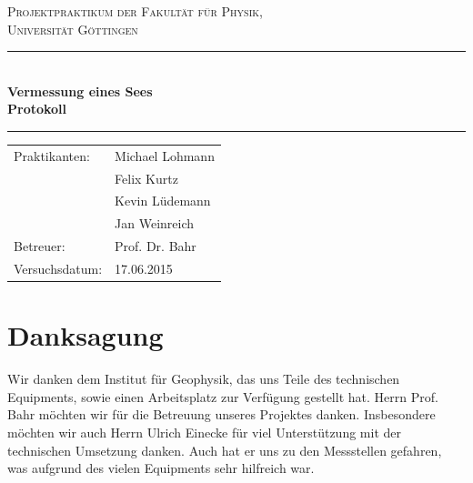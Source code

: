 \documentclass[12pt,a4paper,titlepage,headinclude,bibtotoc]{scrartcl}
\numberwithin{equation}{subsection}
\newenvironment{bottom}{\par\vspace*{\fill}}{\clearpage}
\begin{document}
\begin{titlepage}
\centering
\textsc{\Large Projektpraktikum der Fakultät für
  Physik,\\[1ex] Universität Göttingen}

\vspace*{2cm}

\rule{\textwidth}{1pt}\\[0.5cm]
{\huge \bfseries
  Vermessung eines Sees \\[1ex]
  Protokoll}\\[0.5cm]
\rule{\textwidth}{1pt}

\vspace*{2cm}

\begin{Large}
\begin{tabular}{ll}
Praktikanten: &  Michael Lohmann\\
 &  Felix Kurtz\\
 &  Kevin Lüdemann\\
 &  Jan Weinreich\\
 Betreuer: & Prof. Dr. Bahr\\
 Versuchsdatum: & 17.06.2015\\
\end{tabular}
\end{Large}

\vspace*{3.8cm}

\begin{Large}
\end{Large}

\end{titlepage}
\thispagestyle{empty}
\tableofcontents
\thispagestyle{empty}
\begin{bottom}
\section*{Danksagung}
Wir danken dem Institut für Geophysik, das uns Teile des technischen Equipments, sowie einen Arbeitsplatz zur Verfügung gestellt hat.
Herrn Prof. Bahr möchten wir für die Betreuung unseres Projektes danken.
Insbesondere möchten wir auch Herrn Ulrich Einecke für viel Unterstützung mit der technischen Umsetzung danken.
Auch hat er uns zu den Messstellen gefahren, was aufgrund des vielen Equipments sehr hilfreich war.
\end{bottom}
\newpage
\end{document}
